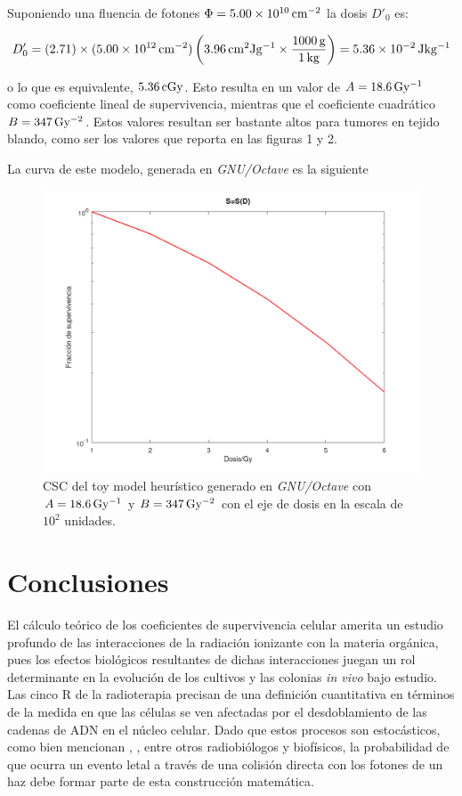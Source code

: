 \documentclass[12pt,letterpaper, oneside]{book}
\begin{document}
	Suponiendo una fluencia de fotones $\Phi=\unit[5.00\times 10^{10}]{cm^{-2}}$ la dosis $D'_0$ es:
	
	$$D'_0=(2.71)\times (\unit[5.00\times 10^{12}]{cm^{-2}})\left(\unit[3.96]{cm^2 Jg^{-1}}\times\frac{\unit[1000]{g}}{\unit[1]{kg}}\right)=\unit[5.36\times10^{-2}]{Jkg^{-1}}$$
	
	\noindent o lo que es equivalente, $\unit[5.36]{cGy}$. Esto resulta en un valor de $\unit[A=18.6]{Gy^{-1}}$ como coeficiente lineal de supervivencia, mientras que el coeficiente cuadrático $B=\unit[347]{Gy^{-2}}$. Estos valores resultan ser bastante altos para tumores en tejido blando, como ser los valores que \cite{Leeuwen.2018} reporta en las figuras 1 y 2. 
	
	La curva de este modelo, generada en \textit{GNU/Octave} es la siguiente
	
	\begin{figure}[h!]
		\centering
		\includegraphics[scale=0.30]{figuras/Csc_toymodel.png}
		\caption{CSC del toy model heurístico generado en \textit{GNU/Octave} con $A=\unit[18.6]{Gy^{-1}}$ y $B=\unit[347]{Gy^{-2}}$ con el eje de dosis en la escala de $10^2$ unidades.}\label{figura_curva_mia}
	\end{figure}  
	
	\chapter{Conclusiones}
	
	El cálculo teórico de los coeficientes de supervivencia celular amerita un estudio profundo de las interacciones de la radiación ionizante con la materia orgánica, pues los efectos biológicos resultantes de dichas interacciones juegan un rol determinante en la evolución de los cultivos y las colonias \textit{in vivo} bajo estudio. Las cinco R de la radioterapia precisan de una definición cuantitativa en términos de la medida en que las células se ven afectadas por el desdoblamiento de las cadenas de ADN en el núcleo celular. Dado que estos procesos son estocásticos, como bien mencionan \cite{Mayles.2007}, \cite{McMahon.2018}, \cite{Hall.2000} entre otros radiobiólogos y biofísicos, la probabilidad de que ocurra un evento letal a través de una colisión directa con los fotones de un haz debe formar parte de esta construcción matemática. 
	
\end{document}
